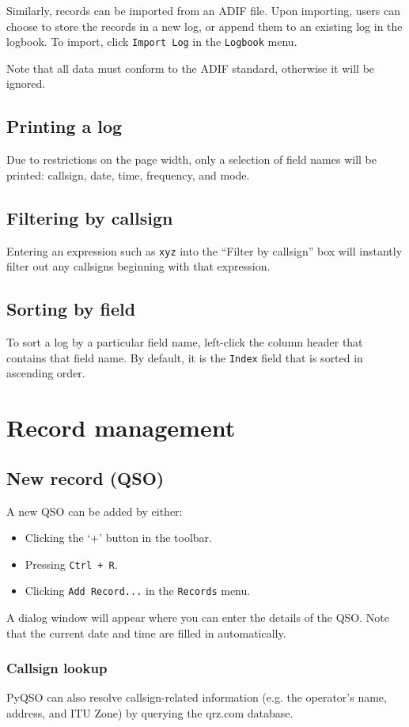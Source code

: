 \documentclass[11pt, a4paper]{report}
\begin{document}
Similarly, records can be imported from an ADIF file. Upon importing, users can choose to store the records in a new log, or append them to an existing log in the logbook. To import, click \texttt{Import Log} in the \texttt{Logbook} menu.

Note that all data must conform to the ADIF standard, otherwise it will be ignored.

\section{Printing a log}
Due to restrictions on the page width, only a selection of field names will be printed: callsign, date, time, frequency, and mode.

\section{Filtering by callsign}
Entering an expression such as \texttt{xyz} into the ``Filter by callsign'' box will instantly filter out any callsigns beginning with that expression.

\section{Sorting by field}
To sort a log by a particular field name, left-click the column header that contains that field name. By default, it is the \texttt{Index} field that is sorted in ascending order.

\chapter{Record management}

\section{New record (QSO)}
A new QSO can be added by either:
\begin{itemize}
  \item Clicking the `+' button in the toolbar.
  \item Pressing \texttt{Ctrl + R}.
  \item Clicking \texttt{Add Record...} in the \texttt{Records} menu.
\end{itemize}
A dialog window will appear where you can enter the details of the QSO. Note that the current date and time are filled in automatically.

\subsection{Callsign lookup}
PyQSO can also resolve callsign-related information (e.g. the operator's name, address, and ITU Zone) by querying the qrz.com database.
\end{document}

